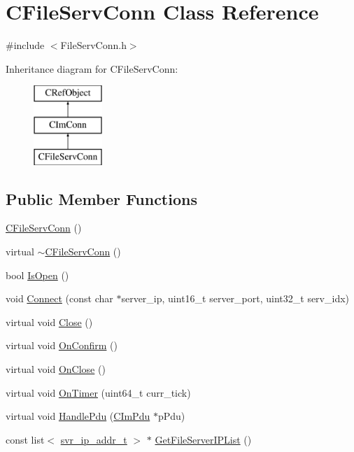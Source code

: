\hypertarget{class_c_file_serv_conn}{}\section{C\+File\+Serv\+Conn Class Reference}
\label{class_c_file_serv_conn}


{\ttfamily \#include $<$File\+Serv\+Conn.\+h$>$}

Inheritance diagram for C\+File\+Serv\+Conn\+:\begin{figure}[H]
\begin{center}
\leavevmode
\includegraphics[height=3.000000cm]{class_c_file_serv_conn}
\end{center}
\end{figure}
\subsection*{Public Member Functions}
\begin{DoxyCompactItemize}
\item 
\hyperlink{class_c_file_serv_conn_a31befdc854bbc8b1cc84612272072717}{C\+File\+Serv\+Conn} ()
\item 
virtual \hyperlink{class_c_file_serv_conn_ae30ce878fc806feb3d792963599c3003}{$\sim$\+C\+File\+Serv\+Conn} ()
\item 
bool \hyperlink{class_c_file_serv_conn_a6b1865f9e1ceb7730eb6afa0b998aff9}{Is\+Open} ()
\item 
void \hyperlink{class_c_file_serv_conn_adb7a6983ec2d7cba713179f2bcc73cff}{Connect} (const char $\ast$server\+\_\+ip, uint16\+\_\+t server\+\_\+port, uint32\+\_\+t serv\+\_\+idx)
\item 
virtual void \hyperlink{class_c_file_serv_conn_a0aae2f759e4ef50651d44eeec4a561f7}{Close} ()
\item 
virtual void \hyperlink{class_c_file_serv_conn_ac40f673b910670974de8a7903d512b90}{On\+Confirm} ()
\item 
virtual void \hyperlink{class_c_file_serv_conn_aaab1284392966c50bc3f9ec22e2f3046}{On\+Close} ()
\item 
virtual void \hyperlink{class_c_file_serv_conn_abe273865a9e7f55360de82d7c251e60a}{On\+Timer} (uint64\+\_\+t curr\+\_\+tick)
\item 
virtual void \hyperlink{class_c_file_serv_conn_a704293812566a83fdfc9023b7451981a}{Handle\+Pdu} (\hyperlink{class_c_im_pdu}{C\+Im\+Pdu} $\ast$p\+Pdu)
\item 
const list$<$ \hyperlink{structsvr__ip__addr__t}{svr\+\_\+ip\+\_\+addr\+\_\+t} $>$ $\ast$ \hyperlink{class_c_file_serv_conn_ac59375eebb3d8bcbc1e6387168df94c8}{Get\+File\+Server\+I\+P\+List} ()
\end{DoxyCompactItemize}
